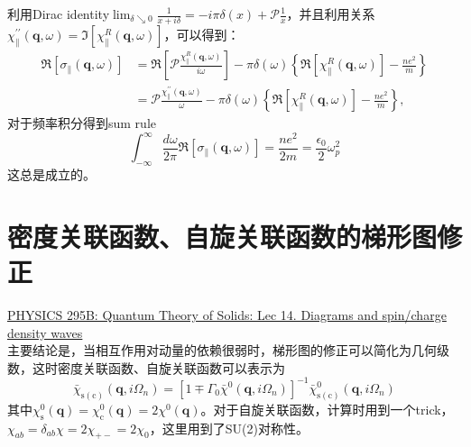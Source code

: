 \documentclass[10pt,openany]{book}
\theoremstyle{thmstyle} %
\theoremstyle{defstyle} %
\theoremstyle{prostyle} %
\begin{document}
利用Dirac identity$ \lim _{\delta \searrow 0} \frac{1}{x+i \delta}=-i \pi \delta(x)+\mathcal{P} \frac{1}{x} $，并且利用关系$ \chi_{\|}^{\prime \prime}(\mathbf{q}, \omega)=\Im\left[\chi_{\|}^R(\mathbf{q}, \omega)\right] $，可以得到：
\begin{equation}
  \begin{aligned}
    \Re\left[\sigma_{\|}(\mathbf{q}, \omega)\right] & =\Re\left[\mathcal{P} \frac{\chi_{\|}^R(\mathbf{q}, \omega)}{i \omega}\right]-\pi \delta(\omega)\left\{\Re\left[\chi_{\|}^R(\mathbf{q}, \omega)\right]-\frac{n e^2}{m}\right\} \\
    & =\mathcal{P} \frac{\chi_{\|}^{\prime \prime}(\mathbf{q}, \omega)}{\omega}-\pi \delta(\omega)\left\{\Re\left[\chi_{\|}^R(\mathbf{q}, \omega)\right]-\frac{n e^2}{m}\right\},
    \end{aligned}
\end{equation}  
对于频率积分得到sum rule
\begin{equation}
  \int_{-\infty}^{\infty} \frac{d \omega}{2 \pi} \Re\left[\sigma_{\|}(\mathbf{q}, \omega)\right]=\frac{n e^2}{2 m}=\frac{\epsilon_0}{2} \omega_p^2
\end{equation}
这总是成立的。
\section{密度关联函数、自旋关联函数的梯形图修正}
\href{https://www.youtube.com/watch?v=jsThAjBPp8s&list=PLcD25rnTeV9geERxK7Tky8XsUghzeArEF&index=14&ab_channel=SubirSachdev}{PHYSICS 295B: Quantum Theory of Solids: Lec 14. Diagrams and spin/charge density waves}\\
主要结论是，当相互作用对动量的依赖很弱时，梯形图的修正可以简化为几何级数，这时密度关联函数、自旋关联函数可以表示为
\begin{equation}
  \bar{\chi}_{\mathrm{s}(\mathrm{c})}\left(\boldsymbol{q}, i \Omega_n\right)=\left[1 \mp \Gamma_0 \bar{\chi}^0\left(\boldsymbol{q}, i \Omega_n\right)\right]^{-1} \bar{\chi}_{\mathrm{s}(\mathrm{c})}^0\left(\boldsymbol{q}, i \Omega_n\right)
\end{equation}
其中$ \chi_{\mathrm{s}}^0(\boldsymbol{q})=\chi_{\mathrm{c}}^0(\boldsymbol{q})=2 \chi^0(\boldsymbol{q}) $。对于自旋关联函数，计算时用到一个trick，$ \chi_{ab} = \delta_{ab}\chi = 2\chi_{+-}= 2\chi_0 $，这里用到了SU(2)对称性。  
\end{document}
